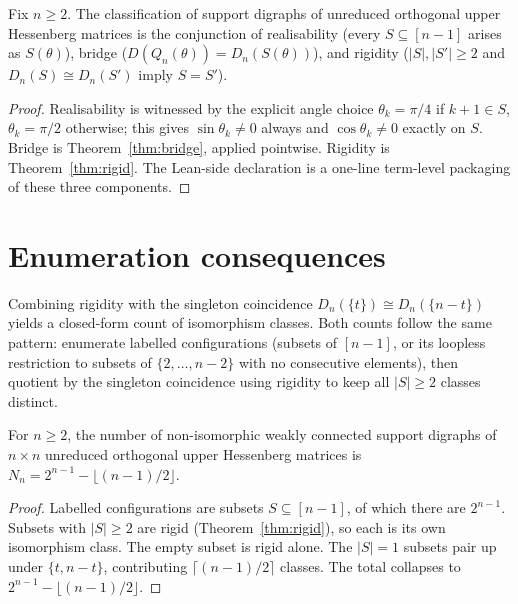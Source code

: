 \begin{theorem}[Classification]\label{thm:class}
  \leanok
  Fix $n \ge 2$. The classification of support digraphs of unreduced
  orthogonal upper Hessenberg matrices is the conjunction of
  realisability (every $S \subseteq [n-1]$ arises as $S(\theta)$),
  bridge ($D(Q_n(\theta)) = D_n(S(\theta))$), and rigidity
  ($|S|,|S'| \ge 2$ and $D_n(S) \cong D_n(S')$ imply $S = S'$).
\end{theorem}
\begin{proof}\leanok{}
  Realisability is witnessed by the explicit angle choice
  $\theta_k = \pi/4$ if $k+1 \in S$, $\theta_k = \pi/2$ otherwise; this
  gives $\sin\theta_k \ne 0$ always and $\cos\theta_k \ne 0$ exactly on
  $S$. Bridge is Theorem~\ref{thm:bridge}, applied pointwise. Rigidity
  is Theorem~\ref{thm:rigid}. The Lean-side declaration is a one-line
  term-level packaging of these three components.
\end{proof}

\chapter{Enumeration consequences}

Combining rigidity with the singleton coincidence
$D_n(\{t\}) \cong D_n(\{n-t\})$ yields a closed-form count of
isomorphism classes. Both counts follow the same pattern: enumerate
labelled configurations (subsets of $[n-1]$, or its loopless
restriction to subsets of $\{2,\dots,n-2\}$ with no consecutive
elements), then quotient by the singleton coincidence using rigidity to
keep all $|S| \ge 2$ classes distinct.

\begin{theorem}\label{thm:count}
  \leanok
  For $n \ge 2$, the number of non-isomorphic weakly connected support
  digraphs of $n \times n$ unreduced orthogonal upper Hessenberg
  matrices is $N_n = 2^{n-1} - \lfloor (n-1)/2 \rfloor$.
\end{theorem}
\begin{proof}\leanok{}
  Labelled configurations are subsets $S \subseteq [n-1]$, of which
  there are $2^{n-1}$. Subsets with $|S| \ge 2$ are rigid
  (Theorem~\ref{thm:rigid}), so each is its own isomorphism class. The
  empty subset is rigid alone. The $|S| = 1$ subsets pair up under
  $\{t, n-t\}$, contributing $\lceil(n-1)/2\rceil$ classes. The total
  collapses to $2^{n-1} - \lfloor (n-1)/2 \rfloor$.
\end{proof}

